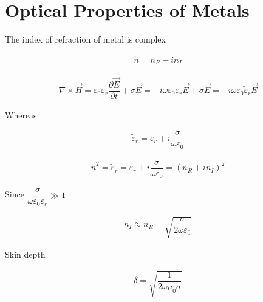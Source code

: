 \section{Optical Properties of Metals}

The index of refraction of metal is complex

\begin{equation*}
  \begin{aligned}
    \tilde{n} = n_R - i n_I
  \end{aligned}
\end{equation*}

\begin{equation*}
  \begin{aligned}
    \nabla \times \vec{H} = \varepsilon_0 \varepsilon_r \dfrac{\partial \vec{E}}{\partial t} + \sigma \vec{E} = - i \omega \varepsilon_0 \varepsilon_r \vec{E} + \sigma \vec{E} = - i \omega \varepsilon_0 \tilde{\varepsilon}_r \vec{E}
  \end{aligned}
\end{equation*}

Whereas

\begin{equation*}
  \begin{aligned}
    \tilde{\varepsilon}_r = \varepsilon_r + i \dfrac{\sigma}{\omega \varepsilon_0} 
  \end{aligned}
\end{equation*}

\begin{equation*}
  \begin{aligned}
    \tilde{n}^2 = \tilde{\varepsilon}_r = \varepsilon_r + i \dfrac{\sigma}{\omega \varepsilon_0} = \left( n_R + i n_I \right)^2
  \end{aligned}
\end{equation*}

Since $\dfrac{\sigma}{\omega \varepsilon_0 \varepsilon_r} \gg 1 $

\begin{equation*}
  \begin{aligned}
    n_I \approx n_R = \sqrt{\dfrac{\sigma}{2 \omega \varepsilon_0} }
  \end{aligned}
\end{equation*}

Skin depth

\begin{equation*}
  \begin{aligned}
    \delta = \sqrt{\dfrac{1}{2 \omega \mu_0 \sigma} }
  \end{aligned}
\end{equation*}

